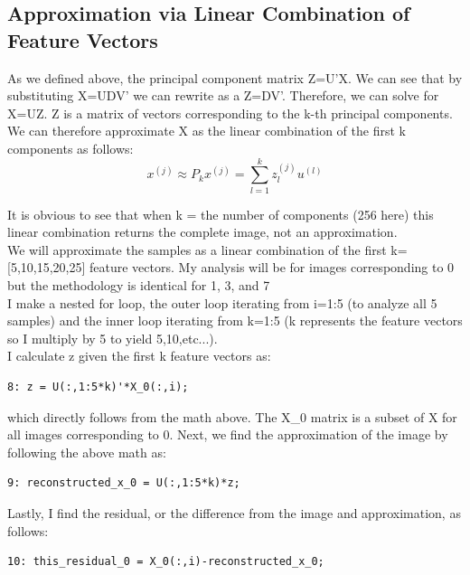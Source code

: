 \documentclass{article}
\begin{document}
\subsection*{Approximation via Linear Combination of Feature Vectors}
As we defined above, the principal component matrix Z=U'X.   We can see that by substituting X=UDV' we can rewrite as a Z=DV'.  Therefore,  we can solve for X=UZ.  Z is a matrix of vectors corresponding to the k-th principal components.  We can therefore approximate X as the linear combination of the first k components as follows:
        \[x^{(j)}\approx P_k x^{(j)} = \sum_{l=1}^{k} z_{l}^{(j)} u^{(l)}\]
        
It is obvious to see that when k = the number of components (256 here) this linear combination returns the complete image, not an approximation.\\
We will approximate the samples as a linear combination of the first k=[5,10,15,20,25] feature vectors.  My analysis will be for images corresponding to 0 but the methodology is identical for 1, 3, and 7\\
I make a nested for loop, the outer loop iterating from i=1:5 (to analyze all 5 samples) and the inner loop iterating from k=1:5 (k represents the feature vectors so I multiply by 5 to yield 5,10,etc...).  
\\I calculate z given the first k feature vectors as:
\begin{verbatim}8: z = U(:,1:5*k)'*X_0(:,i);\end{verbatim}
which directly follows from the math above.  The X\_0 matrix is a subset of X for all images corresponding to 0.  Next, we find the approximation of the image by following the above math as: 
\begin{verbatim}9: reconstructed_x_0 = U(:,1:5*k)*z;\end{verbatim}
Lastly, I find the residual, or the difference from the image and approximation, as follows:
\begin{verbatim}10: this_residual_0 = X_0(:,i)-reconstructed_x_0;
\end{verbatim}
\end{document}
